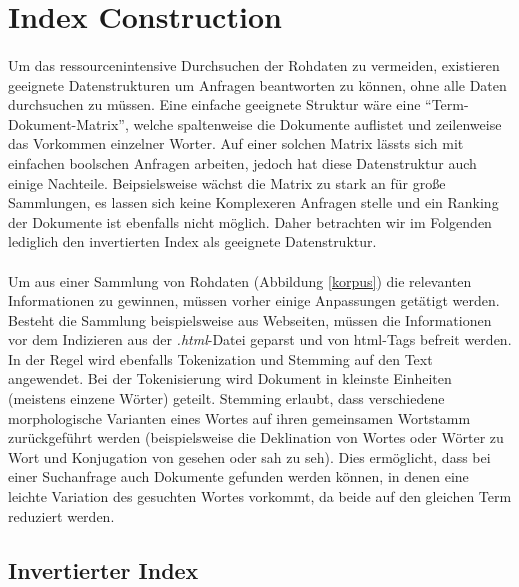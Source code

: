 \section{Index Construction} \label{IndexConstruction}
\paragraph{}
Um das ressourcenintensive Durchsuchen der Rohdaten zu vermeiden, existieren geeignete Datenstrukturen um Anfragen beantworten zu können, ohne alle Daten durchsuchen zu müssen. Eine einfache geeignete Struktur wäre eine \enquote{Term-Dokument-Matrix}, welche spaltenweise die Dokumente auflistet und zeilenweise das Vorkommen einzelner Worter. Auf einer solchen Matrix lässts sich mit einfachen boolschen Anfragen arbeiten, jedoch hat diese Datenstruktur auch einige Nachteile. Beipsielsweise wächst die Matrix zu stark an für große Sammlungen, es lassen sich keine Komplexeren Anfragen stelle und ein Ranking der Dokumente ist ebenfalls nicht möglich. Daher betrachten wir im Folgenden lediglich den invertierten Index als geeignete Datenstruktur.
\par

\paragraph{}
Um aus einer Sammlung von Rohdaten (Abbildung \ref{korpus}) die relevanten Informationen zu gewinnen, müssen vorher einige Anpassungen getätigt werden. Besteht die Sammlung beispielsweise aus Webseiten, müssen die Informationen vor dem Indizieren aus der \textit{.html}-Datei geparst und von html-Tags befreit werden. In der Regel wird ebenfalls Tokenization und Stemming auf den Text angewendet. Bei der Tokenisierung wird Dokument in kleinste Einheiten (meistens einzene Wörter) geteilt. Stemming erlaubt, dass verschiedene morphologische Varianten eines Wortes auf ihren gemeinsamen Wortstamm zurückgeführt werden (beispielsweise die Deklination von Wortes oder Wörter zu Wort und Konjugation von gesehen oder sah zu seh). Dies ermöglicht, dass bei einer Suchanfrage auch Dokumente gefunden werden können, in denen eine leichte Variation des gesuchten Wortes vorkommt, da beide auf den gleichen Term reduziert werden.
\par

\subsection{Invertierter Index} \label{invertedIndex}
